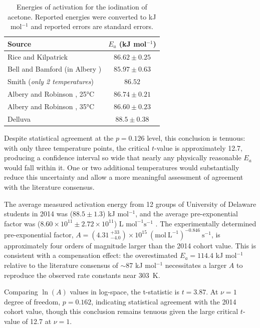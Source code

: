 \documentclass{article}
\begin{document}
\begin{table}[h]
\centering
\caption{Energies of activation for the iodination of acetone. Reported energies were converted to kJ mol$^{-1}$ and reported errors are standard errors.}
\begin{tabular}{lc}
\toprule
Source & $E_a$ (kJ mol$^{-1}$) \\
\midrule
Rice and Kilpatrick  \autocite{rice_measurement_1923} & $86.62 \pm 0.25$ \\
Bell and Bamford (in Albery  \autocite{albery_measurement_1969})    & $85.97 \pm 0.63$ \\
Smith \autocite{smith_57_1934} (\textit{only 2 temperatures})              & $86.52$ \\
Albery and Robinson \autocite{albery_measurement_1969}, 25°C     & $86.74 \pm 0.21$ \\
Albery and Robinson \autocite{albery_measurement_1969}, 35°C     & $86.60 \pm 0.23$ \\
Delluva  \autocite{delluva2015} & $88.5 \pm 0.38$ \\
\bottomrule
\end{tabular}
\label{tab:literatureEA}
\end{table}


Despite statistical agreement at the $p = 0.126$ level, this conclusion is tenuous: with only three temperature points, the critical $t$-value is approximately 12.7, producing a confidence interval so wide that nearly any physically reasonable $E_a$ would fall within it. One or two additional temperatures would substantially reduce this uncertainty and allow a more meaningful assessment of agreement with the literature consensus. 

The average measured activation energy from 12 groups of University of Delaware students in 2014 was ($88.5 \pm 1.3$) kJ mol$^{-1}$, and the average pre-exponential factor was ($8.60 \times 10^{11} \pm 2.72 \times 10^{11}$) L $\mathrm{mol^{-1}s^{-1}}$  \autocite{delluva2015}. The experimentally determined pre-exponential factor, $A = \left(4.31\ ^{+33}_{-4.0}\right) \times10^{15}\ \left(\mathrm{mol\ L^{-1}}\right)^{-0.846}\ \mathrm{s^{-1}}$, is approximately four orders of magnitude larger than the 2014 cohort value. This is consistent with a compensation effect: the overestimated $E_a = 114.4$ kJ mol$^{-1}$ relative to the literature consensus of $\sim$87 kJ mol$^{-1}$ necessitates a larger $A$ to reproduce the observed rate constants near 303~K.

Comparing $\ln(A)$ values in log-space, the t-statistic is $t=3.87$. At $\nu = 1$ degree of freedom, $p = 0.162$, indicating statistical agreement with the 2014 cohort value, though this conclusion remains tenuous given the large critical $t$-value of 12.7 at $\nu = 1$.
\end{document}
